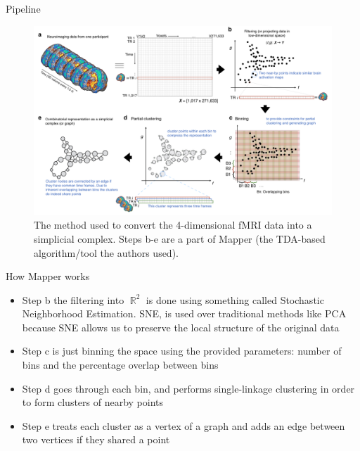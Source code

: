 \documentclass{beamer}
\DeclareMathOperator{\R}{\mathbb{R}}
\begin{document}
\begin{frame}{Pipeline}
    \begin{figure}
        \includegraphics[width = 0.75\linewidth]{fig1.png}
        \caption{The method used to convert the 4-dimensional fMRI data into a simplicial complex. Steps b-e are a part of Mapper (the TDA-based algorithm/tool the authors used).}
    \end{figure}
\end{frame}

\begin{frame}{How Mapper works}
    \begin{itemize}
        \item Step b the filtering into $\R^2$ is done using something called Stochastic Neighborhood Estimation. \pause SNE, is used over traditional methods like PCA because SNE allows us to preserve the local structure of the original data \pause
        \item Step c is just binning the space using the provided parameters: number of bins and the percentage overlap between bins\pause
        \item Step d goes through each bin, and performs single-linkage clustering in order to form clusters of nearby points\pause 
        \item Step e treats each cluster as a vertex of a graph and adds an edge between two vertices if they shared a point\cite{mapper}
    \end{itemize}
\end{frame}
\end{document}

